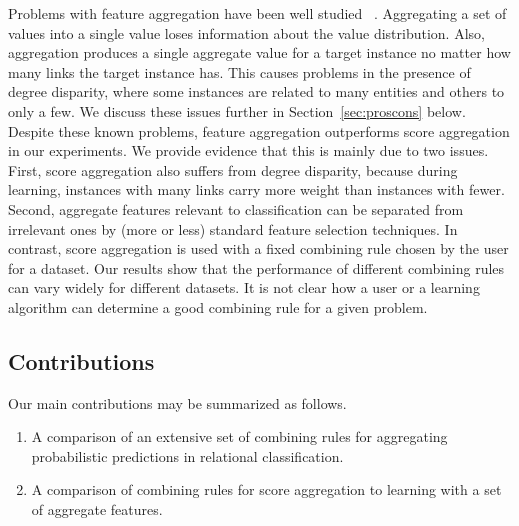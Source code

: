 \documentclass[conference]{IEEEtran}
\begin{document}
Problems with feature aggregation have been well studied~
\cite{Neville2003,Jensen2003}. Aggregating a set of values into a single value loses information about the value distribution. Also, aggregation produces a single aggregate value for a target instance no matter how many links the target instance has. This causes problems in the presence of degree disparity, where some instances are related to many entities and others to only a few. We discuss these issues further in Section~\ref{sec:proscons} below. Despite these known problems, feature aggregation outperforms score aggregation in our experiments. We provide evidence that this is mainly due to two issues. First, score aggregation also suffers from degree disparity, because during learning, instances with many links carry more weight than instances with fewer. Second,  aggregate features relevant to classification can be separated from irrelevant ones by (more or less) standard feature selection techniques. In contrast, score aggregation is used with a fixed combining rule chosen by the user for a dataset. Our results show that the performance of different combining rules can vary widely for different datasets. It is not clear how a user or a learning algorithm can determine a good combining rule for a given problem.


\subsection{Contributions}
Our main contributions may be summarized as follows.

\begin{enumerate}
\item A comparison of an extensive set of combining rules for aggregating probabilistic predictions in relational classification.
\item A comparison of combining rules for score aggregation to learning with a set of aggregate features. %
\end{enumerate}
\end{document}
